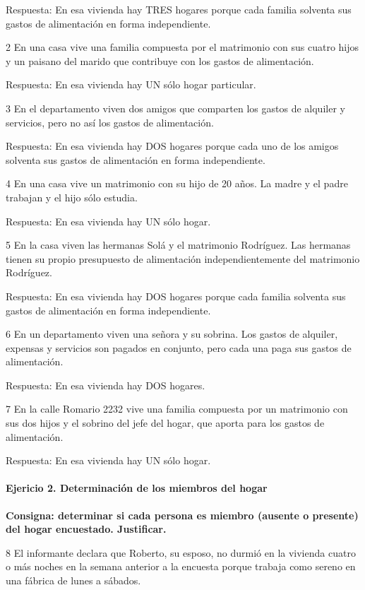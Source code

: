\documentclass[
  openany]{book}
\begin{document}
Respuesta: En esa vivienda hay TRES hogares porque cada familia solventa sus gastos de alimentación en forma independiente.

2 En una casa vive una familia compuesta por el matrimonio con sus cuatro hijos y un paisano del marido que contribuye con los gastos de alimentación.

Respuesta: En esa vivienda hay UN sólo hogar particular.

3 En el departamento viven dos amigos que comparten los gastos de alquiler y servicios, pero no así los gastos de alimentación.

Respuesta: En esa vivienda hay DOS hogares porque cada uno de los amigos solventa sus gastos de alimentación en forma independiente.

4 En una casa vive un matrimonio con su hijo de 20 años. La madre y el padre trabajan y el hijo sólo estudia.

Respuesta: En esa vivienda hay UN sólo hogar.

5 En la casa viven las hermanas Solá y el matrimonio Rodríguez. Las hermanas tienen su propio presupuesto de alimentación independientemente del matrimonio Rodríguez.

Respuesta: En esa vivienda hay DOS hogares porque cada familia solventa sus gastos de alimentación en forma independiente.

6 En un departamento viven una señora y su sobrina. Los gastos de alquiler, expensas y servicios son pagados en conjunto, pero cada una paga sus gastos de alimentación.

Respuesta: En esa vivienda hay DOS hogares.

7 En la calle Romario 2232 vive una familia compuesta por un matrimonio con sus dos hijos y el sobrino del jefe del hogar, que aporta para los gastos de alimentación.

Respuesta: En esa vivienda hay UN sólo hogar.

\hypertarget{ejericio-2.-determinaciuxf3n-de-los-miembros-del-hogar}{%
\paragraph{Ejericio 2. Determinación de los miembros del hogar}\label{ejericio-2.-determinaciuxf3n-de-los-miembros-del-hogar}}

\textbf{Consigna: determinar si cada persona es miembro (ausente o presente) del hogar encuestado. Justificar.}

8 El informante declara que Roberto, su esposo, no durmió en la vivienda cuatro o más noches en la semana anterior a la encuesta porque trabaja como sereno en una fábrica de lunes a sábados.
\end{document}
